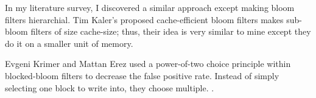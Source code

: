 In my literature survey, I discovered a similar approach except making bloom filters hierarchial.
Tim Kaler's proposed cache-efficient bloom filters \cite{Kaler} makes sub-bloom filters of size cache-size; thus, their idea is very similar to mine except they do it on a smaller unit of memory.

Evgeni Krimer and Mattan Erez used a power-of-two choice principle within blocked-bloom filters to decrease the false positive rate.
Instead of simply selecting one block to write into, they choose multiple.
\cite{Krimer}.

